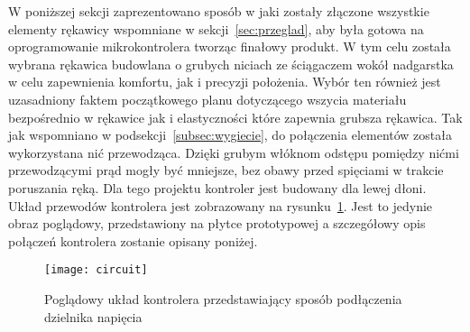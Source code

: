 W poniższej sekcji zaprezentowano sposób w jaki zostały złączone wszystkie elementy rękawicy wspomniane w sekcji~\ref{sec:przeglad}, aby była gotowa na oprogramowanie mikrokontrolera tworząc finałowy produkt. W tym celu została wybrana rękawica budowlana o grubych niciach ze ściągaczem wokół nadgarstka w celu zapewnienia komfortu, jak i precyzji położenia. Wybór ten również jest uzasadniony faktem początkowego planu dotyczącego wszycia materiału bezpośrednio w rękawice jak i elastyczności które zapewnia grubsza rękawica. Tak jak wspomniano w podsekcji~\ref{subsec:wygiecie}, do połączenia elementów została wykorzystana nić przewodząca. Dzięki grubym włóknom odstępu pomiędzy nićmi przewodzącymi prąd mogły być mniejsze, bez obawy przed spięciami w trakcie poruszania ręką. Dla tego projektu kontroler jest budowany dla lewej dłoni. Układ przewodów kontrolera jest zobrazowany na rysunku~\ref{fig:circuit}. Jest to jedynie obraz poglądowy, przedstawiony na płytce prototypowej a szczegółowy opis połączeń kontrolera zostanie opisany poniżej.

\begin{figure}[h]
\centering
\texttt{[image: circuit]}
\caption{Poglądowy układ kontrolera przedstawiający sposób podłączenia dzielnika napięcia}
\label{fig:circuit}
\end{figure}

